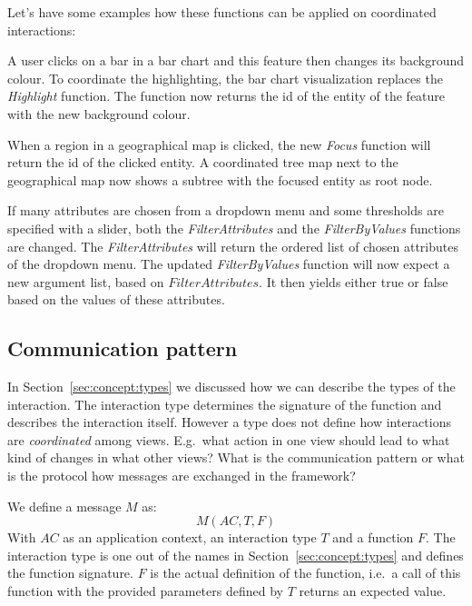 \documentclass{article}
\begin{document}
Let's have some examples how these functions can be applied on coordinated interactions:

A user clicks on a bar in a bar chart and this feature then changes its background colour.
To coordinate the highlighting, the bar chart visualization replaces the \emph{Highlight} function.
The function now returns the id of the entity of the feature with the new background colour.

When a region in a geographical map is clicked, the new \emph{Focus} function will return the id of the clicked entity.
A coordinated tree map next to the geographical map now shows a subtree with the focused entity as root node.

If many attributes are chosen from a dropdown menu and some thresholds are specified with a slider, both the \emph{FilterAttributes} and the \emph{FilterByValues} functions are changed.
The \emph{FilterAttributes} will return the ordered list of chosen attributes of the dropdown menu.
The updated \emph{FilterByValues} function will now expect a new argument list, based on $ FilterAttributes $.
It then yields either true or false based on the values of these attributes.

\subsection{Communication pattern}

In Section~\ref{sec:concept:types} we discussed how we can describe the types of the interaction.
The interaction type determines the signature of the function and describes the interaction itself.
However a type does not define how interactions are \emph{coordinated} among views.
E.g.\ what action in one view should lead to what kind of changes in what other views?
What is the communication pattern or what is the protocol how messages are exchanged in the framework?

We define a message $M$ as:
\begin{equation}
  M(AC, T, F)
\end{equation}
With $AC$ as an application context, an interaction type $T$ and a function $F$.
The interaction type is one out of the names in Section~\ref{sec:concept:types} and defines the function signature.
$F$ is the actual definition of the function, i.e.\ a call of this function with the provided parameters defined by $T$ returns an expected value.
\end{document}
